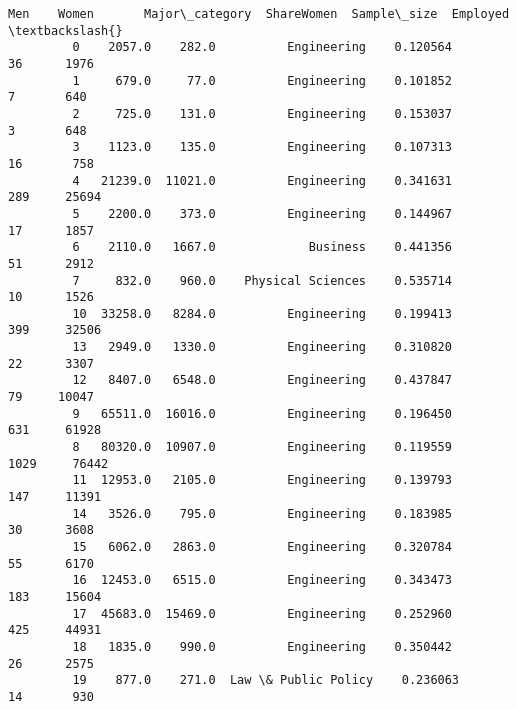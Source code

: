 \documentclass[11pt]{article}
\begin{document}
\begin{Verbatim}[commandchars=\\\{\}]
                 Men    Women       Major\_category  ShareWomen  Sample\_size  Employed  \textbackslash{}
         0    2057.0    282.0          Engineering    0.120564           36      1976   
         1     679.0     77.0          Engineering    0.101852            7       640   
         2     725.0    131.0          Engineering    0.153037            3       648   
         3    1123.0    135.0          Engineering    0.107313           16       758   
         4   21239.0  11021.0          Engineering    0.341631          289     25694   
         5    2200.0    373.0          Engineering    0.144967           17      1857   
         6    2110.0   1667.0             Business    0.441356           51      2912   
         7     832.0    960.0    Physical Sciences    0.535714           10      1526   
         10  33258.0   8284.0          Engineering    0.199413          399     32506   
         13   2949.0   1330.0          Engineering    0.310820           22      3307   
         12   8407.0   6548.0          Engineering    0.437847           79     10047   
         9   65511.0  16016.0          Engineering    0.196450          631     61928   
         8   80320.0  10907.0          Engineering    0.119559         1029     76442   
         11  12953.0   2105.0          Engineering    0.139793          147     11391   
         14   3526.0    795.0          Engineering    0.183985           30      3608   
         15   6062.0   2863.0          Engineering    0.320784           55      6170   
         16  12453.0   6515.0          Engineering    0.343473          183     15604   
         17  45683.0  15469.0          Engineering    0.252960          425     44931   
         18   1835.0    990.0          Engineering    0.350442           26      2575   
         19    877.0    271.0  Law \& Public Policy    0.236063           14       930   
         

\end{Verbatim}
\end{document}
